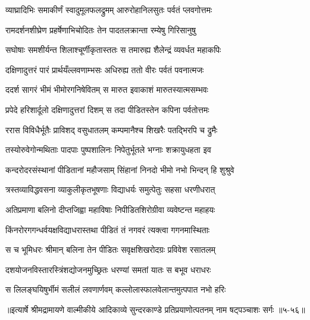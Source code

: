 \twolineshloka
{व्याघ्रादिभिः समाकीर्णं स्वादुमूलफलद्रुमम्}
{आरुरोहानिलसुतः पर्वतं प्लवगोत्तमः} %

\twolineshloka
{रामदर्शनशीघ्रेण प्रहर्षेणाभिचोदितः}
{तेन पादतलक्रान्ता रम्येषु गिरिसानुषु} %

\twolineshloka
{सघोषाः समशीर्यन्त शिलाश्चूर्णीकृतास्ततः}
{स तमारुह्य शैलेन्द्रं व्यवर्धत महाकपिः} %

\twolineshloka
{दक्षिणादुत्तरं पारं प्रार्थयँल्लवणाम्भसः}
{अधिरुह्य ततो वीरः पर्वतं पवनात्मजः} %

\twolineshloka
{ददर्श सागरं भीमं भीमोरगनिषेवितम्}
{स मारुत इवाकाशं मारुतस्यात्मसम्भवः} %

\twolineshloka
{प्रपेदे हरिशार्दूलो दक्षिणादुत्तरां दिशम्}
{स तदा पीडितस्तेन कपिना पर्वतोत्तमः} %

\twolineshloka
{ररास विविधैर्भूतैः प्राविशद् वसुधातलम्}
{कम्पमानैश्च शिखरैः पतद्भिरपि च द्रुमैः} %

\twolineshloka
{तस्योरुवेगोन्मथिताः पादपाः पुष्पशालिनः}
{निपेतुर्भूतले भग्नाः शक्रायुधहता इव} %

\twolineshloka
{कन्दरोदरसंस्थानां पीडितानां महौजसाम्}
{सिंहानां निनदो भीमो नभो भिन्दन् हि शुश्रुवे} %

\twolineshloka
{त्रस्तव्याविद्धवसना व्याकुलीकृतभूषणाः}
{विद्याधर्यः समुत्पेतुः सहसा धरणीधरात्} %

\twolineshloka
{अतिप्रमाणा बलिनो दीप्तजिह्वा महाविषाः}
{निपीडितशिरोग्रीवा व्यवेष्टन्त महाहयः} %

\twolineshloka
{किंनरोरगगन्धर्वयक्षविद्याधरास्तथा}
{पीडितं तं नगवरं त्यक्त्वा गगनमास्थिताः} %

\twolineshloka
{स च भूमिधरः श्रीमान् बलिना तेन पीडितः}
{सवृक्षशिखरोदग्रः प्रविवेश रसातलम्} %

\twolineshloka
{दशयोजनविस्तारस्त्रिंशद्योजनमुच्छ्रितः}
{धरण्यां समतां यातः स बभूव धराधरः} %

\twolineshloka
{स लिलङ्घयिषुर्भीमं सलीलं लवणार्णवम्}
{कल्लोलास्फालवेलान्तमुत्पपात नभो हरिः} %


॥इत्यार्षे श्रीमद्रामायणे वाल्मीकीये आदिकाव्ये सुन्दरकाण्डे प्रतिप्रयाणोत्पतनम् नाम षट्पञ्चाशः सर्गः ॥५-५६॥
